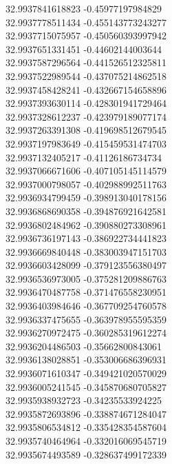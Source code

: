 {32.9937841618823	-0.45977197984829\\
32.9937778511434	-0.455143773243277\\
32.9937715075957	-0.450560393997942\\
32.9937651331451	-0.44602144003644\\
32.9937587296564	-0.441526512325811\\
32.9937522989544	-0.437075214862518\\
32.9937458428241	-0.432667154658896\\
32.9937393630114	-0.428301941729464\\
32.9937328612237	-0.423979189077174\\
32.9937263391308	-0.419698512679545\\
32.9937197983649	-0.415459531474703\\
32.9937132405217	-0.41126186734734\\
32.9937066671606	-0.407105145114579\\
32.9937000798057	-0.402988992511763\\
32.9936934799459	-0.398913040178156\\
32.9936868690358	-0.394876921642581\\
32.9936802484962	-0.390880273308961\\
32.9936736197143	-0.386922734441823\\
32.9936669840448	-0.383003947151703\\
32.9936603428099	-0.379123556380497\\
32.9936536973005	-0.375281209886763\\
32.9936470487758	-0.371476558230951\\
32.9936403984646	-0.367709254760578\\
32.9936337475655	-0.363978955595359\\
32.9936270972475	-0.360285319612274\\
32.9936204486503	-0.35662800843061\\
32.9936138028851	-0.353006686396931\\
32.9936071610347	-0.349421020570029\\
32.9936005241545	-0.345870680705827\\
32.9935938932723	-0.34235533924225\\
32.9935872693896	-0.338874671284047\\
32.9935806534812	-0.335428354587604\\
32.9935740464964	-0.332016069545719\\
32.9935674493589	-0.328637499172339\\
}
